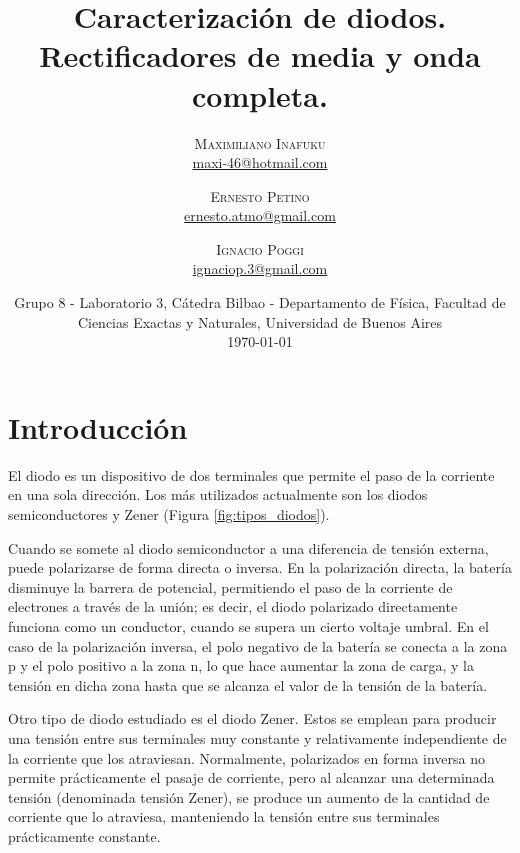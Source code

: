 \documentclass[twoside,twocolumn,a4paper]{article}
\title{Caracterizaci\'on de diodos. Rectificadores de media y onda completa.} %
\author{%
\textsc{Maximiliano Inafuku} \\[1ex] %
\normalsize \href{mailto:maxi-46@hotmail.com}{maxi-46@hotmail.com} %
\and %
\textsc{Ernesto Petino} \\[1ex] %
\normalsize \href{mailto:ernesto.atmo@gmail.com}{ernesto.atmo@gmail.com} %
\and %
\textsc{Ignacio Poggi} \\[1ex] %
\normalsize \href{mailto:ignaciop.3@gmail.com}{ignaciop.3@gmail.com} %
}
\date{Grupo 8 - Laboratorio 3, C\'atedra Bilbao - Departamento de F\'isica, Facultad de Ciencias Exactas y Naturales, Universidad de Buenos Aires \newline \\ \today} %
\begin{document}
\maketitle



\section{Introducci\'on}

El diodo es un dispositivo de dos terminales que permite el paso de la corriente en una sola direcci\'on. Los m\'as utilizados actualmente son los diodos semiconductores y Zener (Figura \ref{fig:tipos_diodos}).\par

Cuando se somete al diodo semiconductor a una diferencia de tensi\'on externa, puede polarizarse de forma directa o inversa. En la polarizaci\'on directa, la bater\'ia disminuye la barrera de potencial, permitiendo el paso de la corriente de electrones a trav\'es de la uni\'on; es decir, el diodo polarizado directamente funciona como un conductor, cuando se supera un cierto voltaje umbral. En el caso de la polarizaci\'on inversa, el polo negativo de la bater\'ia se conecta a la zona p y el polo positivo a la zona n, lo que hace aumentar la zona de carga, y la tensi\'on en dicha zona hasta que se alcanza el valor de la tensi\'on de la bater\'ia. \par

Otro tipo de diodo estudiado es el diodo Zener. Estos se emplean para producir una tensi\'on entre sus terminales muy constante y relativamente independiente de la corriente que los atraviesan. Normalmente, polarizados en forma inversa no permite pr\'acticamente el pasaje de corriente, pero al alcanzar una determinada tensi\'on (denominada tensi\'on Zener), se produce un aumento de la cantidad de corriente que lo atraviesa, manteniendo la tensi\'on entre sus terminales pr\'acticamente constante.
\end{document}
